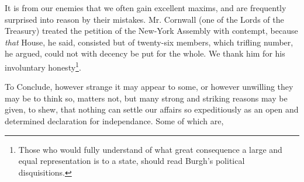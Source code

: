 \documentclass[12pt, twocolumn]{book}
\begin{document}
    It is from our enemies that we often gain excellent maxims, and are frequently surprised into reason by their mistakes. Mr. Cornwall (one of the Lords of the Treasury) treated the petition of the New-York Assembly with contempt, because \textit{that} House, he said, consisted but of twenty-six members, which trifling number, he argued, could not with decency be put for the whole. We thank him for his involuntary honesty\footnote{Those who would fully understand of what great consequence a large and equal representation is to a state, should read Burgh’s political disquisitions.}.

    To Conclude, however strange it may appear to some, or however unwilling they may be to think so, matters not, but many strong and striking reasons may be given, to shew, that nothing can settle our affairs so expeditiously as an open and determined declaration for independance. Some of which are,

    \bigskip
\end{document}

